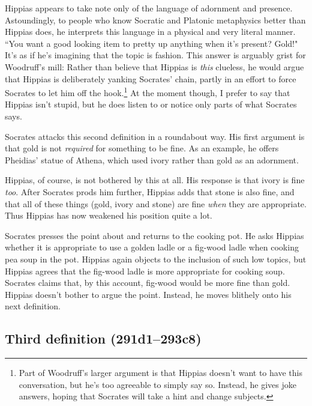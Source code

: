 \documentclass[11pt]{article}
\begin{document}
Hippias appears to take note only of the language of adornment and presence.
Astoundingly, to people who know Socratic and Platonic metaphysics better than
Hippias does, he interprets this language in a physical and very literal
manner.  ``You want a good looking item to pretty up anything when it's
present?  Gold!"  It's as if he's imagining that the topic is fashion.  This
answer is arguably grist for Woodruff's mill: Rather than believe that Hippias
is \emph{this} clueless, he would argue that Hippias is deliberately yanking
Socrates' chain, partly in an effort to force Socrates to let him off the
hook.\footnote{Part of Woodruff's larger argument is that Hippias doesn't want
to have this conversation, but he's too agreeable to simply say so.  Instead,
he gives joke answers, hoping that Socrates will take a hint and change
subjects.}  At the moment though, I prefer to say that Hippias isn't stupid,
but he does listen to or notice only parts of what Socrates says.

Socrates attacks this second definition in a roundabout way.  His first
argument is that gold is not \emph{required} for something to be fine.  As an
example, he offers Pheidias' statue of Athena, which used ivory rather than
gold as an adornment.

Hippias, of course, is not bothered by this at all.  His response is that ivory
is fine \emph{too}.  After Socrates prods him further, Hippias adds that stone
is also fine, and that all of these things (gold, ivory and stone) are fine
\emph{when} they are appropriate.  Thus Hippias has now weakened his position
quite a lot.

Socrates presses the point about  and returns to the cooking
pot.  He asks Hippias whether it is appropriate to use a golden ladle or
a fig-wood ladle when cooking pea soup in the pot.  Hippias again objects to
the inclusion of such low topics, but Hippias agrees that the fig-wood ladle is
more appropriate for cooking soup.  Socrates claims that, by this account,
fig-wood would be more fine than gold.  Hippias doesn't bother to argue the
point.  Instead, he moves blithely onto his next definition.


\subsection{Third definition (291d1--293c8)}
\end{document}
